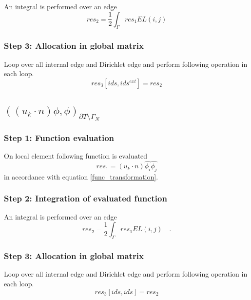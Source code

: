 \documentclass[a4paper,openany]{book}
\begin{document}
An integral is performed over an edge 
\begin{equation}
res_2 = \frac{1}{2} \int_{\Gamma} res_1 EL(i,j)
\end{equation}

\subsubsection{Step 3: Allocation in global matrix}

Loop over all internal edge and Dirichlet edge and perform following operation in each loop.
\begin{equation}
res_3[ids,ids^{ext}] = res_2
\end{equation}

\subsection{$((u_k \cdot n)\phi,\phi)_{\partial T \setminus \Gamma_N}$}

\subsubsection{Step 1: Function evaluation}

On local element following function is evaluated 
\begin{equation}
res_1 = (u_k \cdot n) \hat{\phi_i} \hat{\phi_j}
\end{equation} 
in accordance with equation \ref{func_transformation}.\\

\subsubsection{Step 2: Integration of evaluated function}

An integral is performed over an edge
\begin{equation}
res_2 = \frac{1}{2} \int_{\Gamma} res_1 EL(i,j)  \quad \textrm{.}
\end{equation}

\subsubsection{Step 3: Allocation in global matrix}

Loop over all internal edge and Dirichlet edge and perform following operation in each loop.
\begin{equation}
res_3[ids,ids] = res_2
\end{equation}
\end{document}
